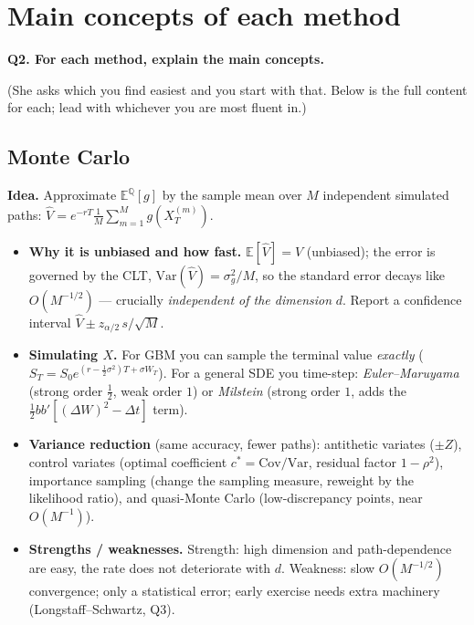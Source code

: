 \documentclass[11pt]{article}
\newcommand{\E}{\mathbb{E}}
\newcommand{\Q}{\mathbb{Q}}
\newcommand{\Qhead}[1]{\bigskip\noindent\textbf{\large #1}\par\nobreak\smallskip}
\begin{document}
\section{Main concepts of each method}
\Qhead{Q2. For each method, explain the main concepts.}
(She asks which you find easiest and you start with that. Below is the full content for each; lead with
whichever you are most fluent in.)

\subsection{Monte Carlo}
\textbf{Idea.} Approximate $\E^{\Q}[g]$ by the sample mean over $M$ independent simulated paths:
$\hat V=e^{-rT}\frac1M\sum_{m=1}^M g(X_T^{(m)})$.
\begin{itemize}
  \item \textbf{Why it is unbiased and how fast.} $\E[\hat V]=V$ (unbiased); the error is governed by the CLT,
  $\mathrm{Var}(\hat V)=\sigma_g^2/M$, so the standard error decays like $O(M^{-1/2})$ --- crucially
  \emph{independent of the dimension} $d$. Report a confidence interval $\hat V\pm z_{\alpha/2}\,s/\sqrt M$.
  \item \textbf{Simulating $X$.} For GBM you can sample the terminal value \emph{exactly}
  ($S_T=S_0e^{(r-\frac12\sigma^2)T+\sigma W_T}$). For a general SDE you time-step:
  \emph{Euler--Maruyama} (strong order $\tfrac12$, weak order $1$) or \emph{Milstein} (strong order $1$,
  adds the $\tfrac12 bb'[(\Delta W)^2-\Delta t]$ term).
  \item \textbf{Variance reduction} (same accuracy, fewer paths): antithetic variates ($\pm Z$), control
  variates (optimal coefficient $c^\ast=\mathrm{Cov}/\mathrm{Var}$, residual factor $1-\rho^2$), importance
  sampling (change the sampling measure, reweight by the likelihood ratio), and quasi-Monte Carlo
  (low-discrepancy points, near $O(M^{-1})$).
  \item \textbf{Strengths / weaknesses.} Strength: high dimension and path-dependence are easy, the rate does
  not deteriorate with $d$. Weakness: slow $O(M^{-1/2})$ convergence; only a statistical error; early exercise
  needs extra machinery (Longstaff--Schwartz, Q3).
\end{itemize}
\end{document}
